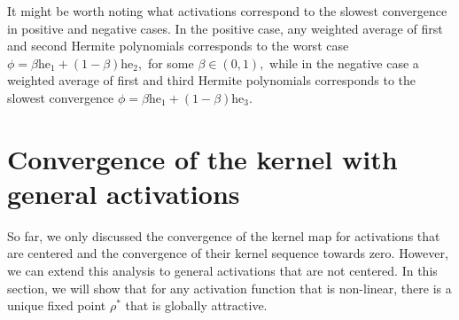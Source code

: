 \documentclass[twoside]{article}
\newcommand{\E}{\E}
\newcommand{\he}{\mathrm{he}}
\theoremstyle{definition}
\newcommand{\thomas}[1]{{\color{blue}TH:  \textit{#1}}}
\begin{document}
It might be worth noting what activations correspond to the slowest convergence in positive and negative cases. In the positive case, any weighted average of first and second Hermite polynomials corresponds to the worst case $\phi = \beta \he_1 + (1-\beta) \he_2,$ for some $\beta \in(0,1),$ while in the negative case a weighted average of first and third Hermite polynomials corresponds to the slowest convergence $\phi = \beta \he_1 + (1-\beta)\he_3. $  




% 





\section{Convergence of the kernel with general activations}
So far, we only discussed the convergence of the kernel map for activations that are centered and the convergence of their kernel sequence towards zero. However, we can extend this analysis to general activations that are not centered. In this section, we will show that for any activation function that is non-linear, there is a unique fixed point $\rho^*$ that is globally attractive.
\end{document}
